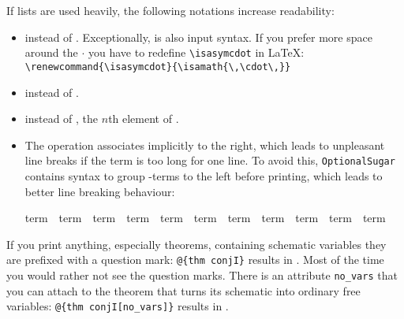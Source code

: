 \begin{isabellebody}
\begin{isamarkuptext}
\begin{itemize}
\end{itemize}%
\end{isamarkuptext}%
\isamarkuptrue%
%
\isamarkuptrue%
%
\begin{isamarkuptext}%
If lists are used heavily, the following notations increase readability:
\begin{itemize}
\item {} instead of .
      Exceptionally,  is also input syntax.
If you prefer more space around the $\cdot$ you have to redefine
\verb!\isasymcdot! in \LaTeX:
\verb!\renewcommand{\isasymcdot}{\isamath{\,\cdot\,}}!

\item {} instead of .
\item {} instead of ,
      the $n$th element of .

\item The \isa{{\isacharat}} operation associates implicitly to the right,
which leads to unpleasant line breaks if the term is too long for one
line. To avoid this, \texttt{OptionalSugar} contains syntax to group
\isa{{\isacharat}}-terms to the left before printing, which leads to better
line breaking behaviour:
\begin{isabelle}%
term\ \isacharat\ term\ \isacharat\ term\ \isacharat\ term\ \isacharat\ term\ \isacharat\ term\ \isacharat\ term\ \isacharat\ term\ \isacharat\ term\ \isacharat\ term\ \isacharat\ term%
\end{isabelle}

\end{itemize}%
\end{isamarkuptext}%
\isamarkuptrue%
%
\isamarkuptrue%
%
\isamarkuptrue%
%
\begin{isamarkuptext}%
If you print anything, especially theorems, containing
schematic variables they are prefixed with a question mark:
\verb!@!\verb!{thm conjI}! results in . Most of the time
you would rather not see the question marks. There is an attribute
\verb!no_vars! that you can attach to the theorem that turns its
schematic into ordinary free variables: \verb!@!\verb!{thm conjI[no_vars]}!
results in .


\end{isamarkuptext}
\end{isabellebody}
